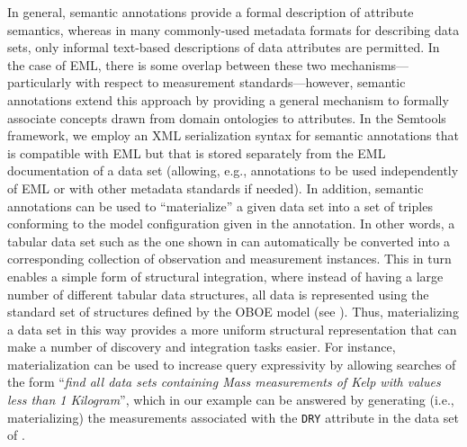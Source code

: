 In general, semantic annotations provide a formal description of
attribute semantics, whereas in many commonly-used metadata formats
for describing data sets, only informal text-based descriptions of
data attributes are permitted.  In the case of EML, there is some
overlap between these two mechanisms---particularly with respect to
measurement standards---however, semantic annotations extend this
approach by providing a general mechanism to formally associate
concepts drawn from domain ontologies to attributes. In the Semtools
framework, we employ an XML serialization syntax for semantic
annotations that is compatible with EML but that is stored separately
from the EML documentation of a data set (allowing, e.g., annotations
to be used independently of EML or with other metadata standards if
needed). In addition, semantic annotations can be used to
``materialize'' a given data set into a set of triples conforming to
the model configuration given in the annotation. In other words, a
tabular data set such as the one shown in 
can automatically be converted into a corresponding collection of
observation and measurement instances. This in turn enables a simple
form of structural integration, where instead of having a large number
of different tabular data structures, all data is represented using
the standard set of structures defined by the OBOE model (see
). Thus, materializing a data set in this way
provides a more uniform structural representation that can make a
number of discovery and integration tasks easier. For instance,
materialization can be used to increase query expressivity by allowing
searches of the form ``\emph{find all data sets containing Mass
  measurements of Kelp with values less than 1 Kilogram}'', which in
our example can be answered by generating (i.e., materializing) the
measurements associated with the {\tt DRY} attribute in the data set
of .






